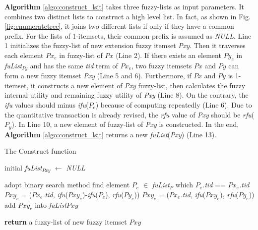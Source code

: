 \documentclass[journal]{IEEEtran}
\begin{document}
\textbf{Algorithm} \ref{algo:construct_lsit} takes three fuzzy-lists as input parameters. It combines two distinct lists to construct a high level list. In fact, as shown in Fig. \ref{fig:enumeratetree}, it joins two different lists if only if they have a common prefix. For the lists of 1-itemsets, their common prefix is assumed as \textit{NULL}. Line 1 initializes the fuzzy-list of new extension fuzzy itemset \textit{Pxy}. Then it traverses each element $Px_e$ in fuzzy-list of $Px$ (Line 2). If there exists an element $Py_e$ in \textit{fuList}$_{Py}$ and has the same \textit{tid} term of $Px_e$, two fuzzy itemsets $Px$ and $Py$ can form a new fuzzy itemset \textit{Pxy} (Line 5 and 6). Furthermore, if $Px$ and $Py$ is 1-itemset, it constructs a new element of \textit{Pxy} fuzzy-list, then calculates the fuzzy internal utility and remaining fuzzy utility of \textit{Pxy} (Line 8). On the contrary, the \textit{ifu} values should minus \textit{ifu}($P_e$) because of computing repeatedly (Line 6). Due to the quantitative transaction is already revised, the \textit{rfu} value of \textit{Pxy} should be \textit{rfu}($P_y$). In Line 10, a new element of fuzzy-list of \textit{Pxy} is constructed. In the end, \textbf{Algorithm} \ref{algo:construct_lsit} returns a new \textit{fuList}(\textit{Pxy}) (Line 13).


\begin{algorithm}
	\caption{The Construct function}
	\label{algo:construct_lsit}
	\LinesNumbered
	
	initial \textit{fuList}$_{Pxy}$ $\leftarrow$ \textit{NULL}\;
	
	 {
		 {
			 {
				adopt binary search method find element $P_e$ $\in$ \textit{fuList}$_{P}$ which  $P_e$\textit{.tid} == $Px_e$\textit{.tid}\;
				$Pxy_e$ = ($Px_e$\textit{.tid}, \textit{ifu}($Pxy_e$)-\textit{ifu}($P_{e}$), \textit{rfu}($Py_e$))\;
			} {
				$Pxy_e$ = ($Px_e$\textit{.tid}, \textit{ifu}($Pxy_e$), \textit{rfu}($Py_e$))\;
			}
			add $Pxy_e$ into \textit{fuList}$Pxy$\;
		}
	}
	
	\textbf{return} a fuzzy-list of new fuzzy itemset $Pxy$
\end{algorithm}
\end{document}
